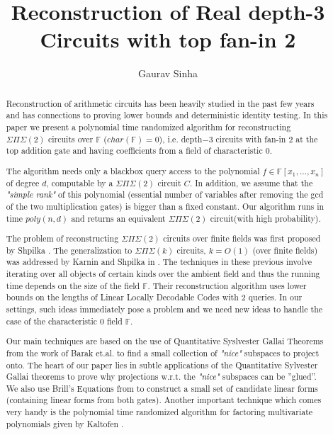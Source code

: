 \documentclass[letterpaper,USenglish,numberwithinsect]{lipics}
\title{Reconstruction of Real depth-3 Circuits with top fan-in 2}
\author{Gaurav Sinha}
\affil{Department of Mathematics, California Institute of Technology, Pasadena CA 91106, USA\\
  \texttt{gsinha@caltech.edu}}
\newcommand{\F}{\mathbb{F}}
\begin{document}
\date{}
\maketitle





\begin{abstract}
Reconstruction of arithmetic circuits has been heavily studied in the past few years and has connections to proving lower bounds and deterministic identity testing. In this paper we present a polynomial time randomized algorithm for reconstructing $\Sigma\Pi\Sigma(2)$ circuits over $\F$ ($char(\F)=0$), i.e. depth$-3$ circuits with fan-in $2$ at the top addition gate and having coefficients from a field of characteristic $0$.

The algorithm needs only a blackbox query access to the polynomial $f \in \F[x_1,\ldots, x_n]$ of degree $d$, computable by a $\Sigma\Pi\Sigma(2)$ circuit $C$. In addition, we assume that the \emph{"simple rank"} of this polynomial (essential number of variables after removing the gcd of the two multiplication gates) is bigger than a fixed constant. Our algorithm runs in time $poly(n, d)$ and returns an equivalent $\Sigma\Pi\Sigma(2)$ circuit(with high probability).

The problem of reconstructing $\Sigma\Pi\Sigma(2)$ circuits over finite fields was first proposed by Shpilka \cite{Shpilka07}. The generalization to $\Sigma\Pi\Sigma(k)$ circuits, $k = O(1)$ (over finite fields) was addressed by Karnin and Shpilka in \cite{KarShp09}. The techniques in these previous involve iterating over all objects of certain kinds over the ambient field and thus the running time depends on the size of the field $\F$. Their reconstruction algorithm uses lower bounds on the lengths of Linear Locally Decodable Codes with $2$ queries. In our settings, such ideas immediately pose a problem and we need new ideas to handle the case of the
characteristic $0$ field $\F$.

Our main techniques are based on the use of Quantitative Syslvester Gallai Theorems from the work of Barak et.al. \cite{BDWY11} to find a small collection of \emph{"nice"} subspaces to project onto. The heart of our paper lies in subtle applications of the Quantitative Sylvester Gallai theorems to prove why projections w.r.t. the \emph{"nice"} subspaces can be ”glued”. We also use Brill's Equations from \cite{GKZ94} to construct a small set of candidate linear forms (containing linear forms from both gates). Another important technique which comes very handy is the polynomial time randomized algorithm for factoring multivariate polynomials given by Kaltofen \cite{KalTr90}.

\end{abstract}
\end{document}
